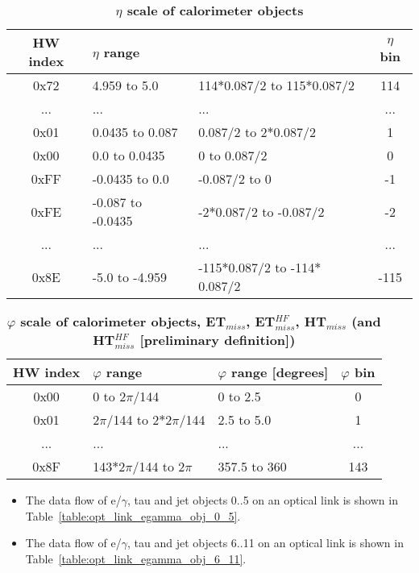 \documentclass{cmspaper}
\begin{document}
\begin{table}[htdp]
\caption{\bf $\eta$ scale of calorimeter objects}
\begin{center}
\begin{tabular}{|c|l|l|c|}\hline
HW index & $\eta$ range &  & $\eta$ bin \\\hline\hline
0x72 & 4.959 to 5.0 & 114$*$0.087/2 to 115$*$0.087/2 & 114\\\hline
... & ... & ... & ...\\\hline
0x01 & 0.0435 to 0.087 & 0.087/2 to 2$*$0.087/2 & 1\\\hline
0x00 & 0.0 to 0.0435 & 0 to 0.087/2 & 0\\\hline
0xFF & -0.0435 to 0.0 & -0.087/2 to 0 & -1\\\hline
0xFE & -0.087 to -0.0435  & -2$*$0.087/2 to -0.087/2 & -2\\\hline
... & ... & ... & ...\\\hline
0x8E & -5.0 to -4.959 & -115$*$0.087/2 to -114$*$0.087/2 & -115\\\hline
\end{tabular}
\end{center}
\label{table:calo_eta_scale}
\end{table}

\begin{table}[htdp]
\caption{\bf $\varphi$ scale of calorimeter objects, ET$_{miss}$, ET$_{miss}^{HF}$, HT$_{miss}$ (and HT$_{miss}^{HF}$ [preliminary definition])}
\begin{center}
\begin{tabular}{|c|l|l|c|}\hline
HW index & $\varphi$ range & $\varphi$ range [degrees] & $\varphi$ bin\\\hline\hline
0x00 & 0 to 2$\pi$/144 & 0 to 2.5 & 0\\\hline
0x01 & 2$\pi$/144 to 2$*$2$\pi$/144 & 2.5 to 5.0 & 1\\\hline
... & ... & ... & ...\\\hline
0x8F & 143$*$2$\pi$/144 to 2$\pi$ & 357.5 to 360 & 143\\\hline
\end{tabular}
\end{center}
\label{table:calo_phi_scale}
\end{table}

\clearpage

\begin{itemize}
\item The data flow of e/$\gamma$, tau and jet objects 0..5 on an optical link is shown in Table~\ref{table:opt_link_egamma_obj_0_5}.
\item The data flow of e/$\gamma$, tau and jet objects 6..11 on an optical link is shown in Table~\ref{table:opt_link_egamma_obj_6_11}.
\end{itemize}
\end{document}

